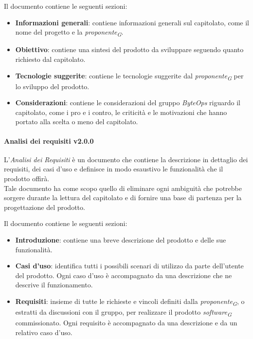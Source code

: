 Il documento contiene le seguenti sezioni:
\begin{itemize}
    \item \textbf{Informazioni generali}: contiene informazioni generali sul capitolato, come il nome del progetto e la \textit{proponente}\textsubscript{\textit{G}}.
    \item \textbf{Obiettivo}: contiene una sintesi del prodotto da sviluppare seguendo quanto richiesto dal capitolato.
    \item \textbf{Tecnologie suggerite}: contiene le tecnologie suggerite dal \textit{proponente}\textsubscript{\textit{G}} per lo sviluppo del prodotto.
    \item \textbf{Considerazioni}: contiene le considerazioni del gruppo \textit{ByteOps} riguardo il capitolato, come i pro e i contro, le criticità e le motivazioni che hanno portato alla scelta o meno del capitolato.
\end{itemize}

\paragraph{Analisi dei requisiti v2.0.0}
L'\textit{Analisi dei Requisiti} è un documento che contiene la descrizione in dettaglio dei requisiti, dei casi d'uso e definisce in modo esaustivo le funzionalità che il prodotto offirà.\\
Tale documento ha come scopo quello di eliminare ogni ambiguità che potrebbe sorgere durante la lettura del capitolato e di fornire una base di partenza per la progettazione del prodotto.

Il documento contiene le seguenti sezioni:

\begin{itemize}
    \item \textbf{Introduzione}: contiene una breve descrizione del prodotto e delle sue funzionalità.
    \item \textbf{Casi d'uso}: identifica tutti i possibili scenari di utilizzo da parte dell'utente del prodotto. Ogni caso d'uso è accompagnato da una descrizione che ne descrive il funzionamento.
    \item \textbf{Requisiti}: insieme di tutte le richieste e vincoli definiti dalla \textit{proponente}\textsubscript{\textit{G}}, o estratti da discussioni con il gruppo, per realizzare il prodotto \textit{software}\textsubscript{\textit{G}} commissionato. Ogni requisito è accompagnato da una descrizione e da un relativo caso d'uso. 
\end{itemize}

